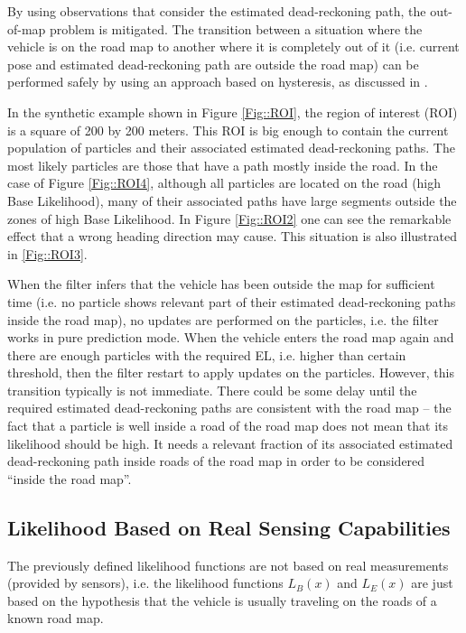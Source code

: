 By using observations that consider the estimated dead-reckoning path, the out-of-map problem is mitigated. The transition between a situation where the vehicle is on the road map to another where it is completely out of it (i.e. current pose and estimated dead-reckoning path are outside the road map) can be performed safely by using an approach based on hysteresis, as discussed in \cite{guivant2007global,guivant2010robust}.

In the synthetic example shown in Figure \ref{Fig::ROI}, the region of interest (ROI) is a square of 200 by 200 meters. This ROI is big enough to contain the current population of particles and their associated estimated dead-reckoning paths. The most likely particles are those that have a path mostly inside the road. In the case of Figure \ref{Fig::ROI4}, although all particles are located on the road (high Base Likelihood), many of their associated paths have large segments outside the zones of high Base Likelihood. In Figure \ref{Fig::ROI2} one can see the remarkable effect that a wrong heading direction may cause. This situation is also illustrated in \ref{Fig::ROI3}.

When the filter infers that the vehicle has been outside the map for sufficient time (i.e. no particle shows relevant part of their estimated dead-reckoning paths inside the road map), no updates are performed on the particles, i.e. the filter works in pure prediction mode. When the vehicle enters the road map again and there are enough particles with the required EL, i.e. higher than certain threshold, then the filter restart to apply updates on the particles. However, this transition typically is not immediate. There could be some delay until the required estimated dead-reckoning paths are consistent with the road map -- the fact that a particle is well inside a road of the road map does not mean that its likelihood should be high. It needs a relevant fraction of its associated estimated dead-reckoning path inside roads of the road map in order to be considered ``inside the road map''.


\subsection{Likelihood Based on Real Sensing Capabilities}

The previously defined likelihood functions are not based on real measurements (provided by sensors), i.e. the likelihood functions $L_B(x)$  and $L_E(x)$ are just based on the hypothesis that the vehicle is usually traveling on the roads of a known road map.

